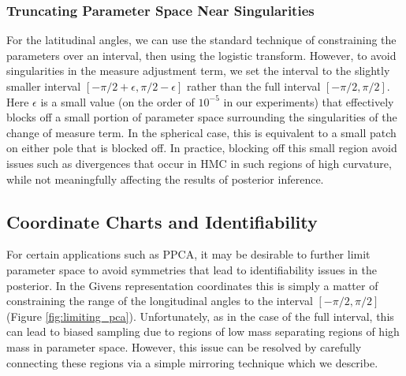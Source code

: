 \documentclass[ba]{imsart}
\numberwithin{equation}{section}
\theoremstyle{plain}
\begin{document}
\subsubsection{Truncating Parameter Space Near Singularities}
\noindent  For the latitudinal angles, we can use the standard technique of constraining the parameters over an interval, then using the logistic transform. However, to avoid singularities in the measure adjustment term, we set the interval to the slightly smaller interval $[-\pi/2 + \epsilon, \pi/2 - \epsilon]$ rather than the full interval $[-\pi/2, \pi/2]$. Here $\epsilon$ is a small value (on the order of $10^{-5}$ in our experiments) that effectively blocks off a small portion of parameter space surrounding the singularities of the change of measure term. In the spherical case, this is equivalent to a small patch on either pole that is blocked off. In practice, blocking off this small region avoid issues such as divergences that occur in HMC in such regions of high curvature, while not meaningfully affecting the results of posterior inference.

\subsection{Coordinate Charts and Identifiability}\label{charts_identifiability}
For certain applications such as PPCA, it may be desirable to further limit parameter space to avoid symmetries that lead to identifiability issues in the posterior. In the Givens representation coordinates this is simply a matter of constraining the range of the longitudinal angles to the interval $[-\pi/2,\pi/2]$ (Figure \ref{fig:limiting_pca}). Unfortunately, as in the case of the full interval, this can lead to biased sampling due to regions of low mass separating regions of high mass in parameter space. However, this issue can be resolved by carefully connecting these regions via a simple mirroring technique which we describe.
\end{document}
